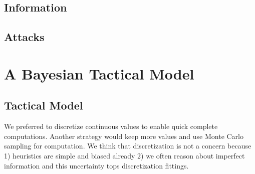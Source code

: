 \subsection{Information}
\subsection{Attacks}


\section{A Bayesian Tactical Model}

\subsection{Tactical Model}


We preferred to discretize continuous values to enable quick complete computations. Another strategy would keep more values and use Monte Carlo sampling for computation. We think that discretization is not a concern because 1) heuristics are simple and biased already 2) we often reason about imperfect information and this uncertainty tops discretization fittings.
